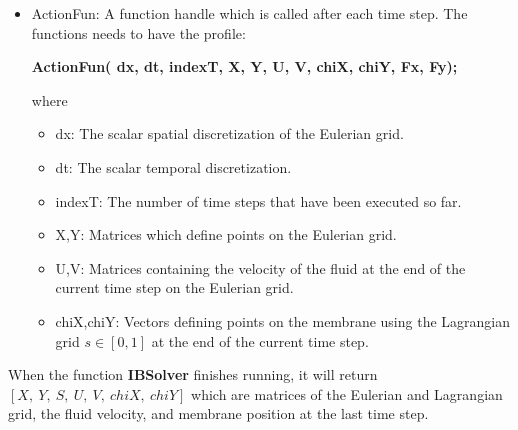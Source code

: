 \documentclass{article}
\begin{document}
\begin{itemize}
\item ActionFun: A function handle which is called after each time step. The functions
							needs to have the profile:\\
							\begin{center}{\bf ActionFun( dx, dt, indexT, X, Y, U, V, chiX, chiY, Fx, Fy);}\end{center}
							where 
							\begin{itemize}
								\item dx: The scalar spatial discretization of the Eulerian grid.
								\item dt: The scalar temporal discretization.
								\item indexT: The number of time steps that have been executed so far.
								\item X,Y: Matrices which define points on the Eulerian grid.
								\item U,V: Matrices containing the velocity of the fluid at the end of the current time step on the Eulerian grid. 
								\item chiX,chiY: Vectors defining points on the membrane using the Lagrangian grid $s\in[0,1]$ at the end of the 
										current time step.
							\end{itemize}
\end{itemize}
When the function {\bf IBSolver} finishes running, it will return $[X,~Y,~S,~U,~V,~chiX,~chiY]$ which are matrices of the Eulerian and Lagrangian grid,
the fluid velocity, and membrane position at the last time step.


\newpage



\end{document}
